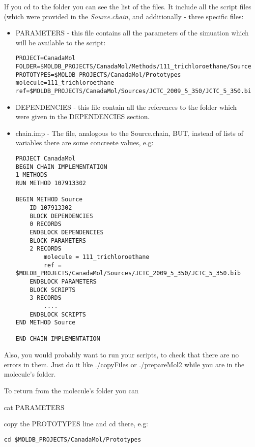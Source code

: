 \documentclass[12pt]{article}
\begin{document}
If you cd to the folder you can see the list of the files.
It include all the script files (which were provided in the \emph{Source.chain}, and additionally - three specific files:
\begin{itemize}

\item PARAMETERS - this file contains all the parameters of the simuation which will be available to the script:
\begin{verbatim}
PROJECT=CanadaMol
FOLDER=$MOLDB_PROJECTS/CanadaMol/Methods/111_trichloroethane/Source/107913302
PROTOTYPES=$MOLDB_PROJECTS/CanadaMol/Prototypes
molecule=111_trichloroethane
ref=$MOLDB_PROJECTS/CanadaMol/Sources/JCTC_2009_5_350/JCTC_5_350.bib
\end{verbatim}

\item DEPENDENCIES - this file contain all the references to the folder which were given in the DEPENDENCIES section.

\item chain.imp - The file, analogous to the Source.chain, BUT, instead of lists of variables there are some concreete values, e.g:
\begin{verbatim}
PROJECT CanadaMol
BEGIN CHAIN IMPLEMENTATION
1 METHODS
RUN METHOD 107913302

BEGIN METHOD Source
	ID 107913302
	BLOCK DEPENDENCIES
	0 RECORDS
	ENDBLOCK DEPENDENCIES
	BLOCK PARAMETERS
	2 RECORDS
		molecule = 111_trichloroethane
		ref = $MOLDB_PROJECTS/CanadaMol/Sources/JCTC_2009_5_350/JCTC_5_350.bib
	ENDBLOCK PARAMETERS
	BLOCK SCRIPTS
	3 RECORDS
		.... 
	ENDBLOCK SCRIPTS
END METHOD Source

END CHAIN IMPLEMENTATION

\end{verbatim}

\end{itemize}


Also, you would probably want to run your scripts, to check that there are no errors in them.
Just do it like ./copyFiles or ./prepareMol2 while you are in the molecule's folder.

To return from the molecule's folder you can 

cat PARAMETERS

copy the PROTOTYPES line and cd there, e.g:
\begin{verbatim}
cd $MOLDB_PROJECTS/CanadaMol/Prototypes
\end{verbatim}
\end{document}
